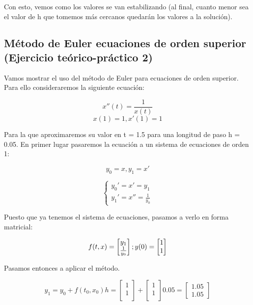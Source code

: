 \documentclass[12pt]{article}       %
\begin{document}
Con esto, vemos como los valores se van estabilizando (al final, cuanto menor sea el valor de h que tomemos más cercanos quedarán los valores a la solución).

\subsection{Método de Euler ecuaciones de orden superior (Ejercicio teórico-práctico 2)}

Vamos mostrar el uso del método de Euler para ecuaciones de orden superior. Para ello consideraremos la siguiente ecuación:%

$$x''(t) = \frac{1}{x(t)}$$
$$ x(1) = 1, x'(1) = 1$$

Para la que aproximaremos su valor en t = 1.5 para una longitud de paso h = 0.05. En primer lugar pasaremos la ecuación a un sistema de ecuaciones de orden 1:

$$ y_0 = x, y_1 = x' $$

$$ 
\begin{cases}
y_0' = x' = y_1\\
y_1' = x'' = \frac{1}{y_0}
\end{cases}
$$

Puesto que ya tenemos el sistema de ecuaciones, pasamos a verlo en forma matricial:

\begin{equation*}
f(t,x)=\begin{bmatrix}
 y_1 \\
 \frac{1}{y_0}\\
\end{bmatrix};\\
y(0)=\begin{bmatrix}
1 \\
1
\end{bmatrix}
\end{equation*}

Pasamos entonces a aplicar el método.

\begin{equation*}
y_1=y_0+f(t_0,x_0)h=\begin{bmatrix}
1\\
1\\
\end{bmatrix} + \begin{bmatrix}
1\\
1\\
\end{bmatrix}0.05=\begin{bmatrix}
1.05\\
1.05
\end{bmatrix}  
\end{equation*}
\end{document}
